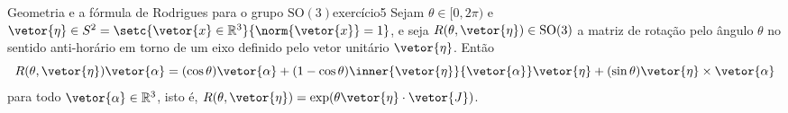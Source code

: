 \begin{proposition}{Geometria e a fórmula de Rodrigues para o grupo \(\mathrm{SO}(3)\)}{exercício5}
    Sejam \(\theta\in [0,2\pi)\) e \(\vetor{\eta} \in S^2 = \setc{\vetor{x}\in \mathbb{R}^3}{\norm{\vetor{x}}= 1}\), e seja \(R(\theta, \vetor{\eta}) \in \mathrm{SO}(3)\) a matriz de rotação pelo ângulo \(\theta\) no sentido anti-horário em torno de um eixo definido pelo vetor unitário \(\vetor{\eta}\). Então
    \begin{equation*}
        R(\theta, \vetor{\eta})\vetor{\alpha} = (\cos\theta)\vetor{\alpha} + (1 - \cos\theta)\inner{\vetor{\eta}}{\vetor{\alpha}}\vetor{\eta} + (\sin\theta)\vetor{\eta}\times\vetor{\alpha}
    \end{equation*}
    para todo \(\vetor{\alpha} \in \mathbb{R}^3\), isto é, \(R(\theta, \vetor{\eta}) = \exp(\theta\vetor{\eta}\cdot\vetor{J})\).
\end{proposition}
